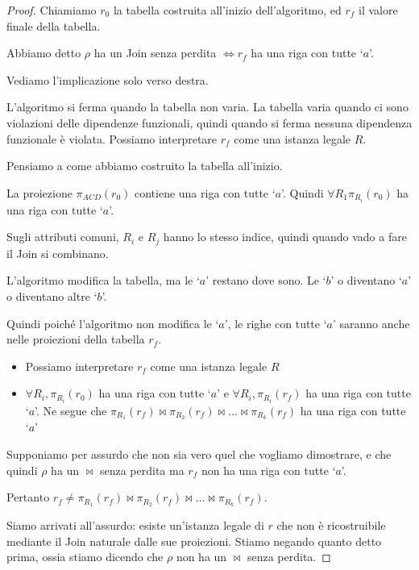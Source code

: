 \begin{proof}
Chiamiamo $r_0$ la tabella costruita all'inizio dell'algoritmo, ed $r_f$ il valore finale della tabella.

Abbiamo detto $\rho$ ha un Join senza perdita $\iff r_f$ ha una riga con tutte `$a$'.

Vediamo l'implicazione solo verso destra.

L'algoritmo si ferma quando la tabella non varia. La tabella varia quando ci sono violazioni delle dipendenze funzionali, quindi quando si ferma nessuna dipendenza funzionale \`e violata. Possiamo interpretare $r_f$ come una istanza legale $R$.

Pensiamo a come abbiamo costruito la tabella all'inizio.

La proiezione $\pi_{ACD} (r_0)$ contiene una riga con tutte `$a$'. Quindi $\forall R_1 \pi_{R_i} (r_0)$ ha una riga con tutte `$a$'.

Sugli attributi comuni, $R_i$ e $R_j$ hanno lo stesso indice, quindi quando vado a fare il Join si combinano.

L'algoritmo modifica la tabella, ma le `$a$' restano dove sono. Le `$b$' o diventano `$a$' o diventano altre `$b$'.

Quindi poich\'e l'algoritmo non modifica le `$a$', le righe con tutte `$a$' saranno anche nelle proiezioni della tabella $r_f$.

\begin{itemize}
    \item Possiamo interpretare $r_f$ come una istanza legale $R$
    \item $\forall R_i , \pi_{R_i} (r_0)$ ha una riga con tutte `$a$' e $\forall R_i , \pi_{R_i} (r_f)$ ha una riga con tutte `$a$'. Ne segue che $\pi_{R_1} (r_f) \Join \pi_{R_2} (r_f) \Join \dots \Join \pi_{R_k} (r_f)$ ha una riga con tutte `$a$'
\end{itemize}

Supponiamo per assurdo che non sia vero quel che vogliamo dimostrare, e che quindi $\rho$ ha un $\Join$ senza perdita ma $r_f$ non ha una riga con tutte `$a$'.

Pertanto $r_f \neq \pi_{R_1} (r_f) \Join \pi_{R_2} (r_f) \Join \dots \Join \pi_{R_k} (r_f)$.

Siamo arrivati all'assurdo: esiste un'istanza legale di $r$ che non \`e ricostruibile mediante il Join naturale dalle sue proiezioni. Stiamo negando quanto detto prima, ossia stiamo dicendo che $\rho$ non ha un $\Join$ senza perdita.
\end{proof}

